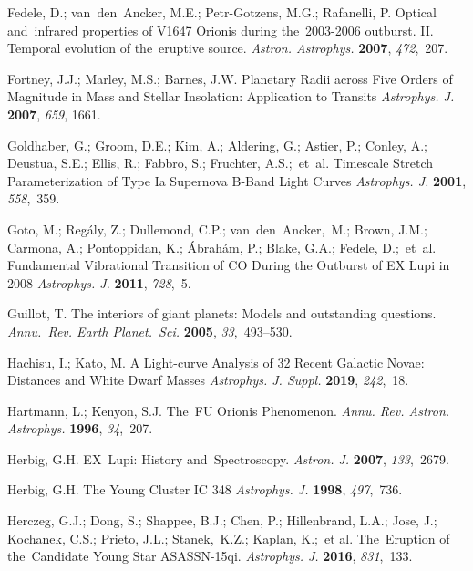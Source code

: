 \documentclass[galaxies,article,accept,moreauthors,pdftex]{mdpi}
\makeatletter
\let\jnl@style=\rmfamily
\def\ref@jnl#1{{\jnl@style#1}}%
\newcommand\aj{\ref@jnl{Astron. J.}}%
\newcommand\araa{\ref@jnl{Annu. Rev. Astron. Astrophys.}}%
\newcommand\apj{\ref@jnl{Astrophys. J.}}%
\newcommand\apjs{\ref@jnl{Astrophys. J. Suppl.}}%
\newcommand\aap{\ref@jnl{Astron. Astrophys.}}%
\makeatother
\begin{document}
\begin{thebibliography}{999}
 Fedele, D.; van~den~Ancker, M.E.; Petr-Gotzens, M.G.; Rafanelli, P. Optical and~infrared properties of V1647 Orionis during the~2003-2006 outburst. II. Temporal evolution of the~eruptive source. {\em \aap} \textbf{2007}, \emph{472},~207.




 Fortney, J.J.; Marley, M.S.;  Barnes, J.W. Planetary Radii across Five Orders of Magnitude in Mass and Stellar Insolation: Application to Transits 
 {\em \apj}  \textbf{2007}, \emph{659}, 1661.



 Goldhaber, G.; Groom, D.E.; Kim, A.; Aldering, G.; Astier, P.; Conley, A.; Deustua, S.E.; Ellis, R.; Fabbro, S.; Fruchter, A.S.;~et~al. Timescale Stretch Parameterization of Type Ia Supernova B-Band Light Curves {\em \apj} \textbf{2001}, \emph{558},~359.



 Goto, M.; Reg{\'a}ly, Z.; Dullemond, C.P.; van~den~Ancker,~M.; Brown, J.M.; Carmona, A.; Pontoppidan, K.; {\'A}brah{\'a}m, P.; Blake, G.A.; Fedele, D.;~et~al. Fundamental Vibrational Transition of CO During the Outburst of EX Lupi in 2008 {\em \apj} \textbf{2011}, \emph{728},~5.


 Guillot, T. The interiors of giant planets: Models and outstanding questions. \emph{Annu.~Rev. Earth Planet.~Sci.} \textbf{2005}, \emph{33},~493--530.


 Hachisu, I.; Kato, M. A Light-curve Analysis of 32 Recent Galactic Novae: Distances and White Dwarf Masses  {\em \apjs} \textbf{2019}, \emph{242},~18.


 Hartmann, L.; Kenyon, S.J. The~FU Orionis Phenomenon. {\em \araa} \textbf{1996}, \emph{34},~207.



 Herbig, G.H. EX~Lupi: History and~Spectroscopy. {\em \aj} \textbf{2007}, \emph{133},~2679. 


 Herbig, G.H.  The Young Cluster IC 348 {\em \apj} \textbf{1998}, \emph{497},~736.



 Herczeg, G.J.; Dong, S.; Shappee, B.J.; Chen, P.; Hillenbrand, L.A.; Jose, J.; Kochanek, C.S.; Prieto, J.L.; Stanek,~K.Z.; Kaplan, K.;~et al. The~Eruption of the~Candidate Young Star ASASSN-15qi. {\em \apj} \textbf{2016}, \emph{831},~133. 




\end{thebibliography}
\end{document}
